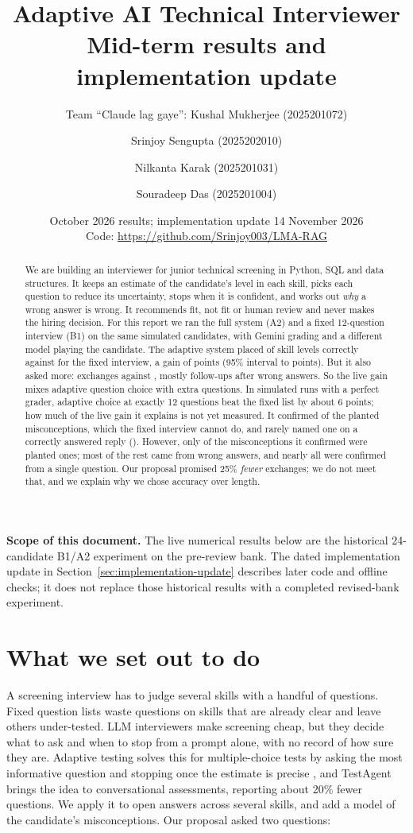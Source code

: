 \documentclass[11pt,a4paper]{article}
\title{Adaptive AI Technical Interviewer\\[2pt]\large Mid-term results and implementation update}
\author{Team ``Claude lag gaye'': Kushal Mukherjee (2025201072) \and Srinjoy Sengupta (2025202010)
  \and Nilkanta Karak (2025201031) \and Souradeep Das (2025201004)}
\date{October 2026 results; implementation update 14 November 2026\\[4pt]\small Code: \url{https://github.com/Srinjoy003/LMA-RAG}}
\begin{document}
\maketitle

\noindent\textbf{Scope of this document.} The live numerical results below are the historical
24-candidate B1/A2 experiment on the pre-review bank. The dated implementation update
in Section~\ref{sec:implementation-update} describes later code and offline checks; it does
not replace those historical results with a completed revised-bank experiment.

\begin{abstract}
We are building an interviewer for junior technical screening in Python, SQL and data structures.
It keeps an estimate of the candidate's level in each skill, picks each question to reduce its
uncertainty, stops when it is confident, and works out \emph{why} a wrong answer is wrong. It
recommends fit, not fit or human review and never makes the hiring decision. For this report we
ran the full system (A2) and a fixed 12-question interview (B1) on the same \nCandidates{}
simulated candidates, with Gemini grading and a different model playing the candidate. The
adaptive system placed \accOurs{} of skill levels correctly against \accBase{} for the fixed
interview, a gain of \accGap{} points (95\% interval \accGapLow{} to \accGapHigh{} points). But it
also asked more: \exchOurs{} exchanges against \exchBase{}, mostly follow-ups after wrong answers.
So the live gain mixes adaptive question choice with extra questions. In simulated runs with a
perfect grader, adaptive choice at exactly 12 questions beat the fixed list by about 6 points; how
much of the live gain it explains is not yet measured. It confirmed \found{} of the
\planted{} planted misconceptions, which the fixed interview cannot do, and rarely named one on a
correctly answered reply (\falseAlarmOurs{}). However, only \precisionOurs{} of the misconceptions it
confirmed were planted ones; most of the rest came from wrong answers, and nearly all were
confirmed from a single question. Our proposal promised 25\% \emph{fewer} exchanges; we do not meet
that, and we explain why we chose accuracy over length.
\end{abstract}

\section{What we set out to do}

A screening interview has to judge several skills with a handful of questions. Fixed question
lists waste questions on skills that are already clear and leave others under-tested. LLM
interviewers make screening cheap, but they decide what to ask and when to stop from a prompt
alone, with no record of how sure they are. Adaptive testing solves this for multiple-choice
tests by asking the most informative question and stopping once the estimate is precise
\cite{zhuang2024}, and TestAgent \cite{yu2025} brings the idea to conversational assessments,
reporting about 20\% fewer questions. We apply it to open answers across several skills, and add a model of the candidate's
misconceptions. Our proposal asked two questions:
\end{document}
